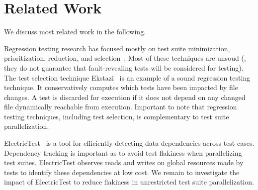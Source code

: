 \section{Related Work}
\label{sec:related}
We discuss most related work in the following.


Regression testing research has focused mostly on test suite
minimization, prioritization, reduction, and
selection~\cite{yoo-harman-stvr2012,soetens-etal-2016}.  Most of these
techniques are unsoud (\ie{}, they do not guarantee that
fault-revealing tests will be considered for testing).  The test
selection technique
Ekstazi~\cite{gligoric-etal-issta2015,celik-etal-fse2017} is an
example of a sound regression testing technique. It conservatively
computes which tests have been impacted by file changes.  A test is
discarded for execution if it does not depend on any changed file
dynamically reachable from execution. Important
to note that regression testing techniques, including test selection,
is complementary to test suite parallelization.


ElectricTest~\cite{bell-etal-esecfse2015} is a tool for efficiently
detecting data dependencies across test cases.  Dependency tracking is
important as to avoid test flakiness when parallelizing test
suites. ElectricTest observes reads and writes on global resources
made by tests to identify these dependencies at low cost. We remain to
investigate the impact of ElectricTest to reduce flakiness in
unrestricted test suite parallelization.


